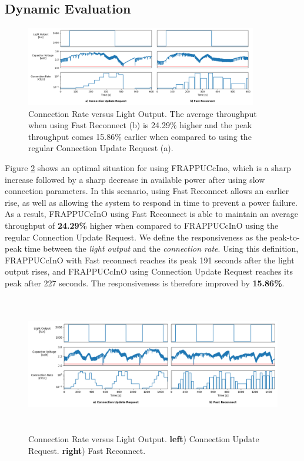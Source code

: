 \subsection{Dynamic Evaluation}
\label{sec:dynamic_evaluation}
\begin{figure}[]
    \centering
    \includegraphics[width=0.9\textwidth,keepaspectratio=true]{plots/dynamic_short_both.png}
    \caption{
        Connection Rate versus Light Output. The average throughput when using Fast Reconnect (b) is 24.29\% higher and the peak throughput comes 15.86\% earlier when compared to using the regular Connection Update Request (a).
    }
    \label{fig:dynamic_short_both}
\end{figure}

Figure \ref{fig:dynamic_long_both} shows an optimal situation for using FRAPPUCcIno, which is a sharp increase followed by a sharp decrease in available power after using slow connection parameters. In this scenario, using Fast Reconnect allows an earlier rise, as well as allowing the system to respond in time to prevent a power failure. As a result, FRAPPUCcInO using Fast Reconnect is able to maintain an average throughput of \textbf{24.29\%} higher when compared to FRAPPUCcInO using the regular Connection Update Request. We define the responsiveness as the peak-to-peak time between the \textit{light output} and the \textit{connection rate}. Using this definition, FRAPPUCcInO with Fast reconnect reaches its peak 191 seconds after the light output rises, and FRAPPUCcInO using Connection Update Request reaches its peak after 227 seconds. The responsiveness is therefore improved by \textbf{15.86\%}.


\begin{figure}[]
    \centering
    \includegraphics[width=1\textwidth,height=6cm,keepaspectratio=true]{plots/dynamic_long_both.png}
    \caption{
        Connection Rate versus Light Output. \textbf{left}) Connection Update Request. \textbf{right}) Fast Reconnect.
    }
    \label{fig:dynamic_long_both}
\end{figure}

